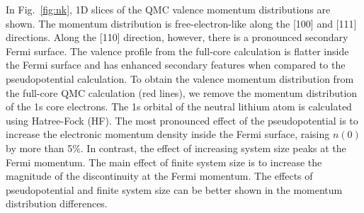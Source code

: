 \documentclass[aps,prb,showpacs,preprintnumbers,amsmath,amssymb,superscriptaddress,twocolumn]{revtex4-1}
\begin{document}
In Fig.~\ref{fig:nk}, 1D slices of the QMC valence momentum distributions are shown. The momentum distribution is free-electron-like along the [100] and [111] directions. Along the [110] direction, however, there is a pronounced secondary Fermi surface. The valence profile from the full-core calculation is flatter inside the Fermi surface and has enhanced secondary features when compared to the pseudopotential calculation. To obtain the valence momentum distribution from the full-core QMC calculation (red lines), we remove the momentum distribution of the 1s core electrons. The 1s orbital of the neutral lithium atom is calculated using Hatree-Fock (HF). The most pronounced effect of the pseudopotential is to increase the electronic momentum density inside the Fermi surface, raising $n(0)$ by more than 5\%. In contrast, the effect of increasing system size peaks at the Fermi momentum. The main effect of finite system size is to increase the magnitude of the discontinuity at the Fermi momentum. The effects of pseudopotential and finite system size can be better shown in the momentum distribution differences.
\end{document}
